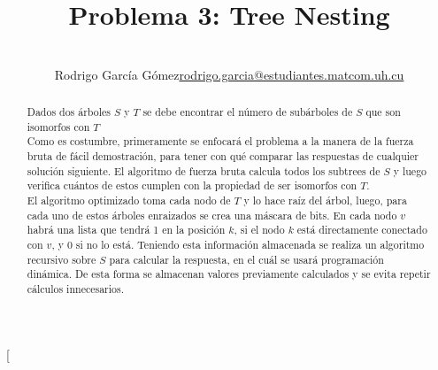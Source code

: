 \documentclass[a4paper,12pt,twocolumn]{article}
\title{Problema 3: Tree Nesting}
\author{\\
\name Rodrigo García Gómez\email \href{mailto:rodrigo.garcia@estudiantes.matcom.uh.cu}{rodrigo.garcia@estudiantes.matcom.uh.cu}
}
\begin{document}

\twocolumn[
\maketitle


\begin{abstract}
Dados dos árboles $S$ y $T$ se debe encontrar el número de subárboles de $S$ que son isomorfos con $T$\\
Como es costumbre, primeramente se enfocará el problema a la manera de la fuerza bruta de fácil demostración, para tener con qué comparar las respuestas de cualquier solución siguiente. El algoritmo de fuerza bruta calcula todos los subtrees de $S$ y luego verifica cuántos de estos cumplen con la propiedad de ser isomorfos con $T$.\\
El algoritmo optimizado toma cada nodo de $T$ y lo hace raíz del árbol, luego, para cada uno de estos árboles enraizados se crea una máscara de bits. En cada nodo $v$ habrá una lista que tendrá 1 en la posición $k$, si el nodo $k$ está directamente conectado con $v$, y 0 si no lo está. Teniendo esta información almacenada se realiza un algoritmo recursivo sobre $S$ para calcular la respuesta, en el cuál se usará programación dinámica. De esta forma se almacenan valores previamente calculados y se evita repetir cálculos innecesarios.
\end{abstract}

\vspace{0.5cm}



\end{document}
